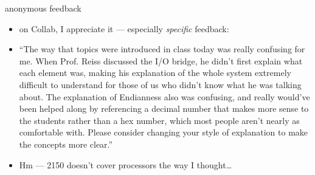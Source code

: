 \begin{frame}{anonymous feedback}
    \begin{itemize}
    \item on Collab, I appreciate it --- especially \textit{specific} feedback:
    \item {\small``The way that topics were introduced in class today was really confusing for me. When Prof. Reiss discussed the I/O bridge, he didn't first explain what each element was, making his explanation of the whole system extremely difficult to understand for those of us who didn't know what he was talking about. The explanation of Endianness also was confusing, and really would've been helped along by referencing a decimal number that makes more sense to the students rather than a hex number, which most people aren't nearly as comfortable with. Please consider changing your style of explanation to make the concepts more clear.''}
    \item Hm --- 2150 doesn't cover processors the way I thought\ldots
    \end{itemize}
\end{frame}
